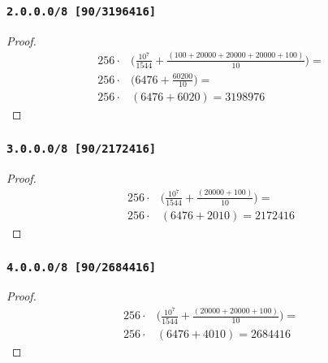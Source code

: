 \documentclass[12pt, times]{simauth}
\begin{document}
\begin{minipage}[t]{0.45\linewidth}
\subsubsection{\texttt{2.0.0.0/8 [90/3196416]}}
\begin{proof}
    \begin{align*}
        256 \cdot & \bigg(\frac{10^7}{1544} + \frac{(100 + 20000 + 20000 + 20000 + 100)}{10}\bigg) = \\
        256 \cdot & \bigg(6476 + \frac{60200}{10} \bigg) = \\
        256 \cdot & (6476 + 6020) = 3198976
    \end{align*}
\end{proof}
\subsubsection{\texttt{3.0.0.0/8 [90/2172416]}}
\begin{proof}
    \begin{align*}
        256 \cdot & \bigg(\frac{10^7}{1544} + \frac{(20000 + 100)}{10}\bigg) = \\
        256 \cdot & (6476 + 2010) = 2172416
    \end{align*}
\end{proof}
\subsubsection{\texttt{4.0.0.0/8 [90/2684416]}}
\begin{proof}
    \begin{align*}
        256 \cdot & \bigg(\frac{10^7}{1544} + \frac{(20000 + 20000 + 100)}{10}\bigg) = \\
        256 \cdot & (6476 + 4010) = 2684416
    \end{align*}
\end{proof}
\end{minipage} \hfill
\end{document}

